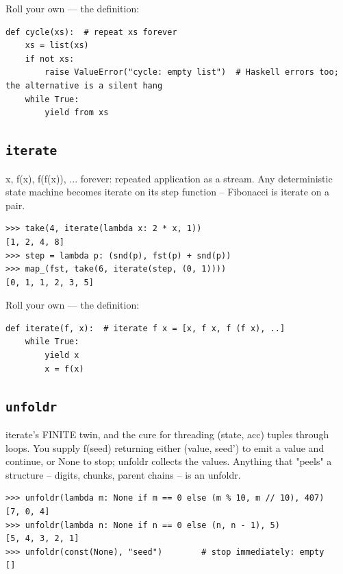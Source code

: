 \documentclass[10pt,letterpaper]{book}
\begin{document}
Roll your own --- the definition:

\begin{lstlisting}[style=ex]
def cycle(xs):  # repeat xs forever
    xs = list(xs)
    if not xs:
        raise ValueError("cycle: empty list")  # Haskell errors too; the alternative is a silent hang
    while True:
        yield from xs
\end{lstlisting}

\subsection{\texttt{iterate}}\label{def:iterate}
x, f(x), f(f(x)), ... forever: repeated application as a stream. Any deterministic state machine becomes iterate on its step function -- Fibonacci is iterate on a pair.
\begin{lstlisting}[style=ex]
>>> take(4, iterate(lambda x: 2 * x, 1))
[1, 2, 4, 8]
>>> step = lambda p: (snd(p), fst(p) + snd(p))
>>> map_(fst, take(6, iterate(step, (0, 1))))
[0, 1, 1, 2, 3, 5]
\end{lstlisting}

Roll your own --- the definition:

\begin{lstlisting}[style=ex]
def iterate(f, x):  # iterate f x = [x, f x, f (f x), ..]
    while True:
        yield x
        x = f(x)
\end{lstlisting}

\subsection{\texttt{unfoldr}}\label{def:unfoldr}
iterate's FINITE twin, and the cure for threading (state, acc) tuples through loops. You supply f(seed) returning either (value, seed') to emit a value and continue, or None to stop; unfoldr collects the values. Anything that "peels" a structure -- digits, chunks, parent chains -- is an unfoldr.
\begin{lstlisting}[style=ex]
>>> unfoldr(lambda m: None if m == 0 else (m % 10, m // 10), 407)
[7, 0, 4]
>>> unfoldr(lambda n: None if n == 0 else (n, n - 1), 5)
[5, 4, 3, 2, 1]
>>> unfoldr(const(None), "seed")        # stop immediately: empty
[]
\end{lstlisting}
\end{document}
